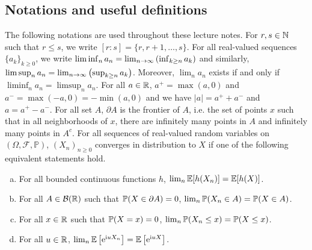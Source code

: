 \documentclass[english,graybox,envcountchap,envcountsame,sectrefs,shortlabels]{svmono}
\theoremstyle{style}
\newcommand{\borel}{\mathcal{B}}
\newcommand{\eqLaw}{\stackrel{\mathcal L}{=}}
\newcommand{\indep}{\rotatebox[origin=c]{90}{$\models$}}
\newcommand{\rme}{\mathrm{e}}
\newcommand{\rmi}{\mathrm{i}}
\begin{document}
\subsection*{Notations and useful definitions}
The following notations are used throughout these lecture notes. For $r,s \in \mathbb{N}$ such that $r\leq s$, we write $[r:s]=\{r,r+1,\ldots,s\}$. For all real-valued sequences $\{a_k\}_{k\geq 0}$, we write $\liminf_n a_n=\lim_{n \to\infty} \left(\inf_{k \geq n} a_k\right)$ and similarly, $\limsup_n a_n=\lim_{n \to\infty} \left(\sup_{k \geq n} a_k\right)$. Moreover, $\lim_n a_n$ exists if and only if $\liminf_n a_n=\limsup_n a_n$. For all $a\in \mathbb{R}$, $a^+=\max(a,0)$ and $a^-=\max(-a,0)=-\min(a,0)$ and we have $|a|=a^++a^-$ and $a=a^+-a^-$. For all set $A$, $\partial A$ is the frontier of $A$, i.e. the set of points $x$ such that in all neighborhoods of $x$, there are infinitely many points in $A$ and infinitely many points in $A^c$.
For all sequences of real-valued random variables on $(\Omega,\mathcal{F},\mathbb{P})$, $(X_n)_{n\geq 0}$ converges in distribution to $X$ if one of the following  equivalent statements hold.
     \begin{enumerate}[(a)]
     \item For all bounded continuous functions $h$, $\lim_{n}\mathbb{E}[h(X_n)]=\mathbb{E}[h(X)]$.
    \item  For all $A \in \borel(\rset)$ such that $\mathbb{P}(X \in \partial A)=0$,  $\lim_n \mathbb{P}(X_n \in A)=\mathbb{P}(X\in A)$.
        \item For all $x\in \mathbb{R}$ such that $\mathbb{P}(X=x)=0$, $\lim_n \mathbb{P}(X_n \leq x)=\mathbb{P}(X \leq x)$.
\item For all $u \in \mathbb{R}$, $\lim_n \PE\lrb{\rme^{\rmi u X_n}}=\PE\lrb{\rme^{\rmi u X}}$.
     \end{enumerate}
\end{document}
